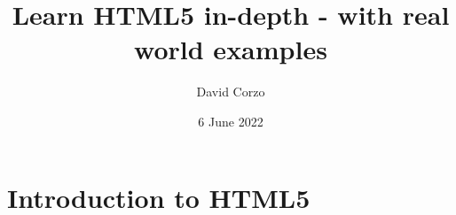 \documentclass[openany]{book}
\title{Learn HTML5 in-depth - with real world examples}
\date{6 June 2022}
\author{David Corzo}
\begin{document}
\maketitle
\tableofcontents

\chapter{Introduction to HTML5}


\end{document}

